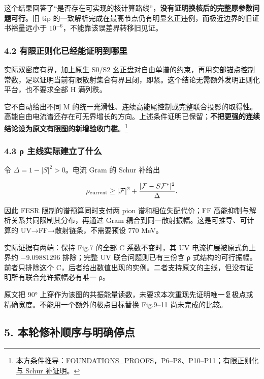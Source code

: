 \documentclass[
  11pt,
  a4paper,
]{article}
\begin{document}
这个结果回答了``是否存在可实现的核计算路线''，\textbf{没有证明换核后的完整原参数问题可行}。旧
tip
的一致解析完成在最高节点仍有明显幺正违例，而极近边界的旧证书裕量远小于
\(10^{-6}\)，不能靠该误差界转移旧见证。

\subsubsection{4.2
有限正则化已经能证明到哪里}\label{ux6709ux9650ux6b63ux5219ux5316ux5df2ux7ecfux80fdux8bc1ux660eux5230ux54eaux91cc}

实际双密度有界，加上原生 S0/S2
幺正盘对自由单谱的约束，再用实部锚点控制常数，足以证明当前有限散射集合有界且闭，即紧。这个结论无需额外发明正则化平台，也不要求全部
H 满列秩。

它不自动给出不同 M
的统一光滑性、连续高能尾控制或完整联合投影的取得性。高能自由电流谱还存在可无界增长的方向。上述条件证明已保留；\textbf{不把更强的连续结论设为原文有限图的新增验收门槛}。\footnote{本方条件推导：\href{../../evidence/FOUNDATIONS_PROOFS_20260910.md}{FOUNDATIONS\_PROOFS}，P6--P8、P10--P11；\href{../../evidence/RHO_FINITE_MODEL_THEOREMS_20260910.md}{有限正则化与
  Schur 补证明}。}

\subsubsection{4.3 ρ
主线实际建立了什么}\label{ux3c1-ux4e3bux7ebfux5b9eux9645ux5efaux7acbux4e86ux4ec0ux4e48}

令 \(\Delta=1-|S|^2>0\)。电流 Gram 的 Schur 补给出

\[
\rho_{\rm current}\ge|\mathcal F|^2+
\frac{|\mathcal F-S\mathcal F^*|^2}{\Delta}.
\]

因此 FESR 限制的谱预算同时支付两 pion 谱和相位失配代价；FF
高能抑制与解析关系共同限制其分布，再通过 Gram
耦合到同一散射振幅。这是可推导、可计算的 UV→FF→散射链条，不需要预设 770
MeV。

实际证据有两端：保持 Fig.7 的全部 C 系数不变时，其 UV
电流扩展被原式负上界约 −9.09881296 排除；完整 UV 联合问题则已有三份含 ρ
式结构的可行振幅。前者只排除这个
C，后者给出数值出现的实例。二者支持原文的主线，但没有证明所有联合允许振幅必有唯一
ρ。

原文把 90°
上穿作为该图的共振能量读数，未要求本次重现先证明唯一复极点或精确宽度。不能用一个额外的极点目标替换
Fig.9--11 尚未完成的比较。

\subsection{5.
本轮修补顺序与明确停点}\label{ux672cux8f6eux4feeux8865ux987aux5e8fux4e0eux660eux786eux505cux70b9}
\end{document}

